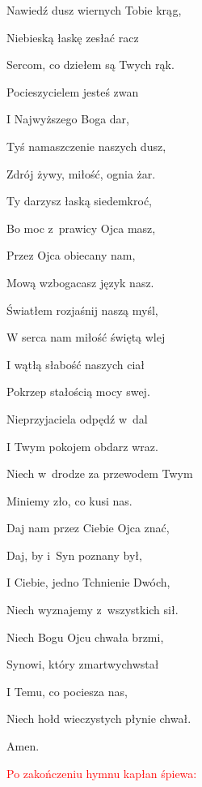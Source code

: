 \begin{Parallel}[v]{0.45\textwidth}{0.52\textwidth}
{Nawiedź dusz wiernych Tobie krąg,

Niebieską łaskę zesłać racz

Sercom, co dziełem są Twych rąk.

\quad Pocieszycielem jesteś zwan

I Najwyższego Boga dar,

Tyś namaszczenie naszych dusz,

Zdrój żywy, miłość, ognia żar.

\quad Ty darzysz łaską siedemkroć,

Bo moc z~prawicy Ojca masz,

Przez Ojca obiecany nam,

Mową wzbogacasz język nasz.

\quad Światłem rozjaśnij naszą myśl,

W serca nam miłość świętą wlej

I wątłą słabość naszych ciał

Pokrzep stałością mocy swej.

\quad Nieprzyjaciela odpędź w~dal

I Twym pokojem obdarz wraz.

Niech w~drodze za przewodem Twym

Miniemy zło, co kusi nas.

\quad Daj nam przez Ciebie Ojca znać,

Daj, by i~Syn poznany był,

I Ciebie, jedno Tchnienie Dwóch,

Niech wyznajemy z~wszystkich sił.

\quad Niech Bogu Ojcu chwała brzmi,

Synowi, który zmartwychwstał

I Temu, co pociesza nas,

Niech hołd wieczystych płynie chwał. 

Amen.
}
\end{Parallel}

\newpage

\begin{center}
\textcolor{red}{Po zakończeniu hymnu kapłan śpiewa:}
\end{center}

